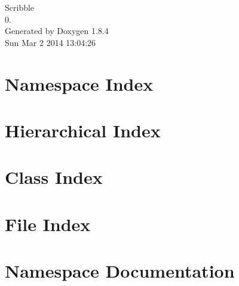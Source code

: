 \documentclass[twoside]{book}
\newcommand{\clearemptydoublepage}{%
  \newpage{\pagestyle{empty}\cleardoublepage}%
}
\begin{document}
\hypersetup{pageanchor=false}
\begin{titlepage}
\vspace*{7cm}
\begin{center}%
{\Large Scribble \\[1ex]\large 0. }\\
\vspace*{1cm}
{\large Generated by Doxygen 1.8.4}\\
\vspace*{0.5cm}
{\small Sun Mar 2 2014 13:04:26}\\
\end{center}
\end{titlepage}
\clearemptydoublepage
\tableofcontents
\clearemptydoublepage
{}
\hypersetup{pageanchor=true}

\chapter{Namespace Index}

\chapter{Hierarchical Index}

\chapter{Class Index}

\chapter{File Index}

\chapter{Namespace Documentation}





\end{document}
